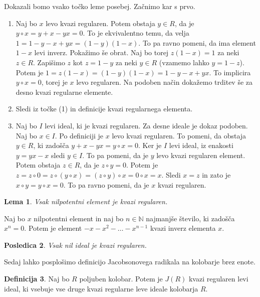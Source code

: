 \documentclass[a4paper, 12pt]{amsart}
\theoremstyle{definition} %
\newtheorem{definicija}{Definicija}[section]
\theoremstyle{plain} %
\newtheorem{lema}[definicija]{Lema}
\newtheorem{posledica}[definicija]{Posledica}
\newcommand{\N}{\mathbb N}
\begin{document}
\proof
Dokazali bomo vsako točko leme posebej. Začnimo kar s prvo.
\begin{enumerate}
\item Naj bo $x$ levo kvazi regularen. Potem obstaja $y\in R$, da je $y\circ x = y+x - yx = 0$. To je ekvivalentno temu, da velja $1 = 1 -y-x + yx = (1-y)(1-x)$. To pa ravno  pomeni, da ima element $1-x$ levi inverz. Pokažimo še obrat. Naj bo torej $z(1-x) = 1$ za neki $z\in R$. Zapišimo $z$ kot $z = 1 -y$ za neki $y\in R$ (vzamemo lahko $y = 1-z$). Potem je $1=z(1-x) = (1-y ) (1-x) = 1 - y -x +yx$. To implicira $y\circ x = 0$, torej je $x$ levo regularen. Na podoben način dokažemo trditev še za desno kvazi regularne elemente.

\item Sledi iz točke (1) in definicije kvazi regularnega elementa. 

\item Naj bo $I$ levi ideal, ki je kvazi regularen. Za desne ideale je dokaz podoben. Naj bo $x\in I$. Po definiciji je $x$ levo kvazi regularen. To pomeni, da obstaja $y\in R$, ki zadošča $y+x - yx = y\circ x = 0$. Ker je $I$ levi ideal, iz enakosti $y = yx - x$ sledi $y\in I$. To pa pomeni, da je $y$ levo kvazi regularen element. Potem obstaja $z \in R$, da je $z\circ y =0$. Potem je $z = z\circ 0 = z \circ (y \circ x) = (z\circ y) \circ x = 0 \circ x = x$. Sledi $x=z$ in zato je $x \circ y = y\circ x = 0$. To pa ravno pomeni, da je $x$ kvazi regularen.
\end{enumerate}
\endproof

\begin{lema}
Vsak nilpotentni element je kvazi regularen.
\end{lema}

\proof
Naj bo $x$ nilpotentni element in naj bo $n\in \N$ najmanjše število, ki zadošča $x^n=0$. Potem je element $-x-x^2 - \dots - x^{n-1}$ kvazi inverz elementa $x$.
\endproof

\begin{posledica}
\label{nilIdealJeKvaziRegularen}
Vsak nil ideal je kvazi regularen.
\end{posledica}

Sedaj lahko posplošimo definicijo Jacobsonovega radikala na kolobarje brez enote.

\begin{definicija}
Naj bo $R$ poljuben kolobar. Potem je $J(R)$ kvazi regularen levi ideal, ki vsebuje vse druge kvazi regularne leve ideale kolobarja $R$.
\end{definicija}
\end{document}
